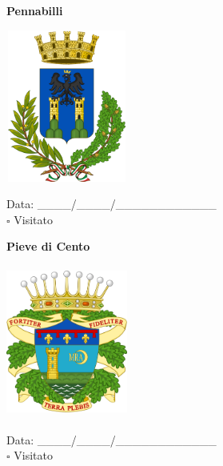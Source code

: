 \documentclass[a5paper,12pt]{article}
\begin{document}
\vspace{0.7cm}

\noindent
\begin{minipage}[t]{0.45\textwidth}
    \begin{center}
        \textbf{Pennabilli}
    \end{center}
    \vspace{-0.5cm} %
    \begin{center}
        \includegraphics[height= 5cm, width=4cm]{Emilia Romagna/Stemma Pennabilli.png}
    \end{center}
    \vspace{-0.4cm} %
    \begin{flushleft}
        Data: \_\_\_\_/\_\_\_\_/\_\_\_\_\_\_\_\_\_\_\_\_ \\
        $\square$ Visitato
    \end{flushleft}
\end{minipage}
\hfill
\noindent
\begin{minipage}[t]{0.45\textwidth}
    \begin{center}
        \textbf{Pieve di Cento}
    \end{center}
    \vspace{-0.5cm} %
    \begin{center}
        \includegraphics[height= 5cm, width=4cm]{Emilia Romagna/Stemma Pieve di Cento.png}
    \end{center}
    \vspace{-0.4cm} %
    \begin{flushleft}
        Data: \_\_\_\_/\_\_\_\_/\_\_\_\_\_\_\_\_\_\_\_\_ \\
        $\square$ Visitato
    \end{flushleft}
\end{minipage}
\end{document}
